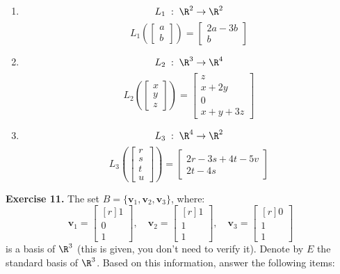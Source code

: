 \documentclass[12pt]{article}
\begin{document}
\begin{enumerate}

\item 
\[
L_1\;:\;\R^2\to\R^2
\]
\[
L_1\left(\begin{bmatrix} a\\b \end{bmatrix}\right) = \begin{bmatrix} 2a-3b \\ b\end{bmatrix}
\]

\item 
\[
L_2\;:\;\R^3\to\R^4
\]
\[
L_2\left(\begin{bmatrix} x\\y\\z\end{bmatrix}\right) = \begin{bmatrix} z\\x+2y\\0\\x+y+3z\end{bmatrix}
\]

\item 
\[
L_3\;:\;\R^4\to\R^2
\]
\[
L_3\left(\begin{bmatrix} r\\s\\t\\u \end{bmatrix}\right) = \begin{bmatrix} 2r-3s+4t-5v\\ 2t-4s\end{bmatrix}
\]

\end{enumerate}

\textbf{Exercise 11.} The set  $B=\{\mathbf{v}_1,\mathbf{v}_2,\mathbf{v}_3\}$, where:
\[
\mathbf{v}_1=\begin{bmatrix*}[r] 1\\ 0\\ 1\end{bmatrix*},\quad
\mathbf{v}_2=\begin{bmatrix*}[r] 1\\ 1\\ 1\end{bmatrix*},\quad
\mathbf{v}_3=\begin{bmatrix*}[r] 0\\ 1\\ 1\end{bmatrix*}
\]
is a basis of $\R^3$ (this is given, you don't need to verify it). Denote by $E$ the standard basis of $\R^3$. Based on this information, answer the following items:
\end{document}
